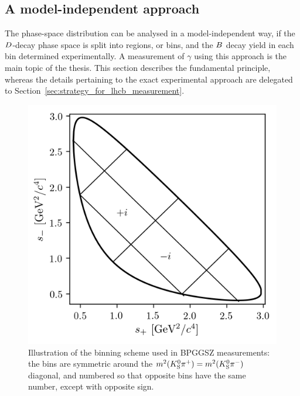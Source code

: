 \subsection{A model-independent approach} %
\label{sub:a_model_independent_approach}


The phase-space distribution can be analysed in a model-independent way, if the ${D}$-decay phase space is split into regions, or bins, and the ${B}$ decay yield in each bin determined experimentally. A measurement of $\gamma$ using this approach is the main topic of the thesis. This section describes the fundamental principle, whereas the details pertaining to the exact experimental approach are delegated to Section~\ref{sec:strategy_for_lhcb_measurement}. 

\begin{figure}[tb]
     \centering
     \includegraphics[width=0.55\columnwidth]{figures/theory/binnings/binning_example.png}
     \caption{Illustration of the binning scheme used in BPGGSZ measurements: the bins are symmetric around the $m^2({{K}^0_{\mathrm{S}}}{{\pi}^+})=m^2({{K}^0_{\mathrm{S}}}{{\pi}^-})$ diagonal, and numbered so that opposite bins have the same number, except with opposite sign.}
     \label{fig:GGSZ_bin_principle}
 \end{figure} 

